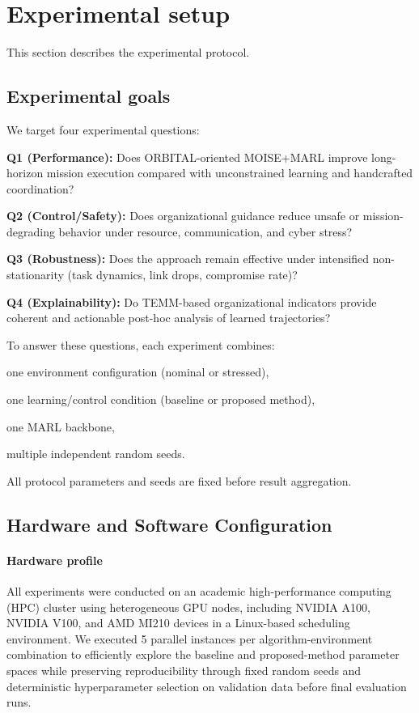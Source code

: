 \documentclass[sigconf]{aamas}
\begin{document}
\section{Experimental setup}
\label{sec:experiments}

This section describes the experimental protocol.

\subsection{Experimental goals}
We target four experimental questions:
\begin{enumerate*}[label={\roman*) },itemjoin={; \quad}]
    \item \textbf{Q1 (Performance):} Does ORBITAL-oriented MOISE+MARL improve long-horizon mission execution compared with unconstrained learning and handcrafted coordination?
    \item \textbf{Q2 (Control/Safety):} Does organizational guidance reduce unsafe or mission-degrading behavior under resource, communication, and cyber stress?
    \item \textbf{Q3 (Robustness):} Does the approach remain effective under intensified non-stationarity (task dynamics, link drops, compromise rate)?
    \item \textbf{Q4 (Explainability):} Do TEMM-based organizational indicators provide coherent and actionable post-hoc analysis of learned trajectories?
\end{enumerate*}

To answer these questions, each experiment combines:
\begin{enumerate*}[label={\roman*) },itemjoin={; \quad}]
    \item one environment configuration (nominal or stressed),
    \item one learning/control condition (baseline or proposed method),
    \item one MARL backbone,
    \item multiple independent random seeds.
\end{enumerate*}
All protocol parameters and seeds are fixed before result aggregation.

\subsection{Hardware and Software Configuration}

\paragraph{Hardware profile}
All experiments were conducted on an academic high-performance computing (HPC) cluster using heterogeneous GPU nodes, including NVIDIA A100, NVIDIA V100, and AMD MI210 devices in a Linux-based scheduling environment. We executed 5 parallel instances per algorithm-environment combination to efficiently explore the baseline and proposed-method parameter spaces while preserving reproducibility through fixed random seeds and deterministic hyperparameter selection on validation data before final evaluation runs.
\end{document}
